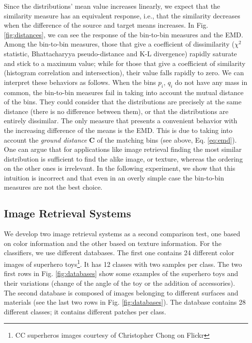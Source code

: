 Since the distributions' mean value increases linearly, we expect that the similarity measure has an equivalent response, i.e., that the similarity decreases when the difference of the source and target means increases. In Fig. \ref{fig:distances}, we can see the response of the bin-to-bin measures and the EMD. Among the bin-to-bin measures, those that give a coefficient of dissimilarity ($\chi^2$ statistic, Bhattacharyya pseudo-distance and K-L divergence) rapidly saturate and stick to a maximum value; while for those that give a coefficient of similarity (histogram correlation and intersection), their value falls rapidly to zero. We can interpret these behaviors as follows. When the bins $p_i$, $q_i$ do not have any mass in common, the bin-to-bin measures fail in taking into account the mutual distance of the bins. They could consider that the distributions are precisely at the same distance (there is no difference between them), or that the distributions are entirely dissimilar. The only measure that presents a convenient behavior with the increasing difference of the means is the EMD. This is due to taking into account the \textit{ground distance} $\mathbf{C}$ of the matching bins (see above, Eq. \ref{eq:emd}). One can argue that for applications like image retrieval finding the most similar distribution is sufficient to find the alike image, or texture, whereas the ordering on the other ones is irrelevant. In the following experiment, we show that this intuition is incorrect and that even in an overly simple case the bin-to-bin measures are not the best choice.
 
\subsection{Image Retrieval Systems}
We develop two image retrieval systems as a second comparison test, one based on color information and the other based on texture information. For the classifiers, we use different databases. The first one contains 24 different color images of superhero toys\footnote{CC superheros images courtesy of Christopher Chong on Flickr}. It has 12 classes with two samples per class. The two first rows in Fig. \ref{fig:databases} show some examples of the superhero toys and their variations (change of the angle of the toy or the addition of accessories). The second database \citep{Kylberg:Dataset:2011} is composed of images belonging to different surfaces and materials (see the last two rows in Fig. \ref{fig:databases}). The database contains 28 different classes; it contains different patches per class. 

